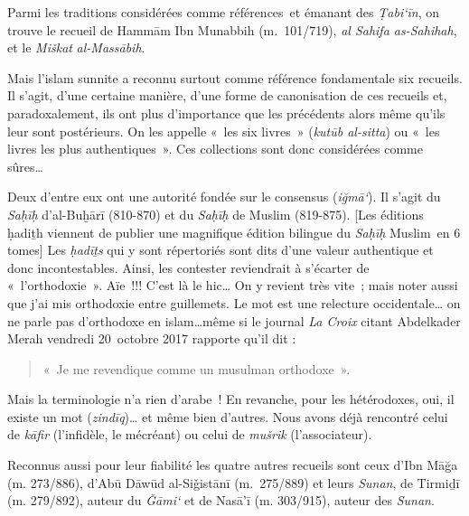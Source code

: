 
Parmi les traditions considérées comme références~et émanant des
\emph{Ṭabi`īn}, on trouve le recueil de Hammām Ibn Munabbih
(m.~101/719),
\emph{al Sahifa as-Sahihah}, et le \emph{Miškat} \emph{al-Massābih}.

Mais l'islam sunnite a reconnu surtout comme référence fondamentale six
recueils. Il s'agit, d'une certaine manière, d'une forme de canonisation
de ces recueils et, paradoxalement, ils ont plus d'importance que les
précédents alors même qu'ils leur sont postérieurs. On les appelle «~les
six livres~» (\emph{kutūb al-sitta}) ou «~les livres les plus
authentiques~». Ces collections sont donc considérées comme
sûres\ldots{}

Deux d'entre eux ont une autorité fondée sur le consensus
(\emph{iğmā`}). Il s'agit du \emph{Saḥīḥ} d'al-Buḫārī (810-870) et du
\emph{Saḥīḥ} de Muslim (819-875). {[}Les éditions ḥadiṯh viennent de
publier une magnifique édition bilingue du \emph{Saḥīḥ} Muslim~en 6
tomes{]} Les \emph{ḥadīṯs} qui y sont répertoriés sont dits d'une valeur
authentique et donc incontestables. Ainsi, les contester reviendrait à
s'écarter de «~l'orthodoxie~». Aïe~!!! C'est là le hic\ldots{} On y
revient très vite~; mais noter aussi que j'ai mis orthodoxie entre
guillemets. Le mot est une relecture occidentale\ldots{} on ne parle pas
d'orthodoxe en islam\ldots même si le journal \emph{La Croix} citant
Abdelkader Merah vendredi 20~octobre 2017 rapporte qu'il dit :
\begin{quote}
    «~Je me revendique comme un musulman orthodoxe~».
\end{quote}
 Mais la
terminologie n'a rien d'arabe~! En revanche, pour les hétérodoxes, oui,
il existe un mot (\emph{zindīq})\ldots{} et même bien d'autres. Nous
avons déjà rencontré celui de \emph{kāfir} (l'infidèle, le mécréant) ou
celui de \emph{mušrik} (l'associateur).

Reconnus aussi pour leur fiabilité les quatre autres recueils sont ceux
d'Ibn Māğa (m. 273/886), d'Abū Dāwūd al-Siǧistānī (m.~275/889) et leurs
\emph{Sunan}, de Tirmiḏī (m. 279/892), auteur du \emph{Ǧāmi`} et de
Nasā'ī (m. 303/915), auteur des \emph{Sunan}.

